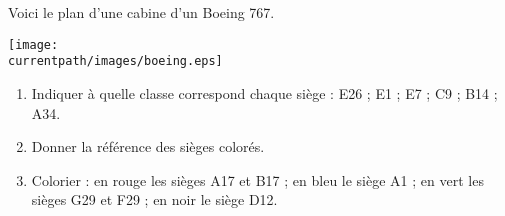 \begin{exercice}
    Voici le plan d'une cabine d'un Boeing 767.
    \begin{center}
       \texttt{[image: \\currentpath/images/boeing.eps]}
    \end{center}
    \begin{enumerate}
       \item Indiquer à quelle classe correspond chaque siège : E26 ; E1 ; E7 ; C9 ; B14 ; A34.
       \item Donner la référence des sièges colorés.
       \item Colorier : en rouge les sièges A17 et B17 ; en bleu le siège A1 ; en vert les sièges G29 et F29 ; en noir le siège D12.
    \end{enumerate}
 \end{exercice}